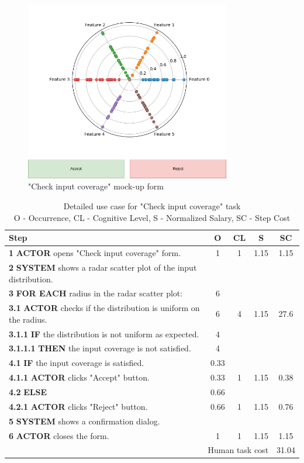 \begin{figure}[H]
\centering
\includegraphics[width=0.8\textwidth]{figures/check_input_coverage.png}
\caption{"Check input coverage" mock-up form}
\end{figure}

\begin{table}[H]
\centering
\begin{tabularx}{\textwidth}{|X|c|c|c|c|}
\hline
\textbf{Step} & \textbf{O} & \textbf{CL} & \textbf{S} & \textbf{SC} \\
\hline
\textbf{1} \textbf{ACTOR} opens "Check input coverage" form. & 1 & 1 & 1.15 & 1.15 \\
\hline
\textbf{2} \textbf{SYSTEM} shows a radar scatter plot of the input distribution. & & & & \\
\hline
\textbf{3} \textbf{FOR EACH} radius in the radar scatter plot: & 6 & & & \\
\hline
\textbf{3.1} \textbf{ACTOR} checks if the distribution is uniform on the radius. & 6 & 4 & 1.15 & 27.6 \\
\hline
\textbf{3.1.1} \textbf{IF} the distribution is not uniform as expected. & 4 & & & \\
\hline
\textbf{3.1.1.1} \textbf{THEN} the input coverage is not satisfied. & 4 & & & \\
\hline
\textbf{4.1} \textbf{IF} the input coverage is satisfied. & 0.33 & & & \\
\hline
\textbf{4.1.1} \textbf{ACTOR} clicks "Accept" button. & 0.33 & 1 & 1.15 & 0.38 \\
\hline
\textbf{4.2} \textbf{ELSE} & 0.66 & & & \\
\hline
\textbf{4.2.1} \textbf{ACTOR} clicks "Reject" button. & 0.66 & 1 & 1.15 & 0.76 \\
\hline
\textbf{5} \textbf{SYSTEM} shows a confirmation dialog. & & & & \\
\hline
\textbf{6} \textbf{ACTOR} closes the form. & 1 & 1 & 1.15 & 1.15 \\
\hline
\multicolumn{4}{|r|}{Human task cost} & 31.04 \\
\hline
\end{tabularx}
\caption{Detailed use case for "Check input coverage" task\\ 
O - Occurrence, CL - Cognitive Level, S - Normalized Salary, SC - Step Cost}
\label{table:check_input_coverage}
\end{table}

